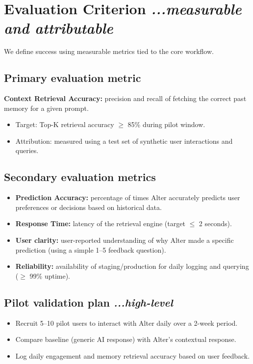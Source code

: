 \documentclass[11pt,a4paper]{article}
\begin{document}
\section[Evaluation Criterion]{Evaluation Criterion \hfill \normalsize\normalfont\textit{...measurable and attributable}}
We define success using measurable metrics tied to the core workflow.

\subsection{Primary evaluation metric}
\textbf{Context Retrieval Accuracy:} precision and recall of fetching the correct past memory for a given prompt.
\begin{itemize}
    \item Target: Top-K retrieval accuracy $\ge$ 85\% during pilot window.
    \item Attribution: measured using a test set of synthetic user interactions and queries.
\end{itemize}

\subsection{Secondary evaluation metrics}
\begin{itemize}
    \item \textbf{Prediction Accuracy:} percentage of times Alter accurately predicts user preferences or decisions based on historical data.
    \item \textbf{Response Time:} latency of the retrieval engine (target $\le$ 2 seconds).
    \item \textbf{User clarity:} user-reported understanding of why Alter made a specific prediction (using a simple 1--5 feedback question).
    \item \textbf{Reliability:} availability of staging/production for daily logging and querying ($\ge$ 99\% uptime).
\end{itemize}

\subsection[Pilot validation plan]{Pilot validation plan \hfill \normalsize\normalfont\textit{...high-level}}
\begin{itemize}
    \item Recruit 5--10 pilot users to interact with Alter daily over a 2-week period.
    \item Compare baseline (generic AI response) with Alter's contextual response.
    \item Log daily engagement and memory retrieval accuracy based on user feedback.
\end{itemize}
\end{document}
